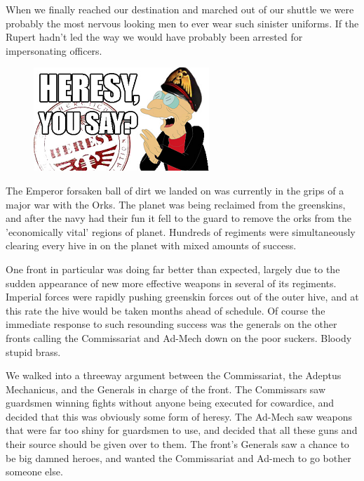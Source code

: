 When we finally reached our destination and marched out of our shuttle we were probably the most nervous looking men to ever wear such sinister uniforms. 
If the Rupert hadn't led the way we would have probably been arrested for impersonating officers.

\begin{figure}
	\begin{center}
		\includegraphics[width=\figwidth]{pics/4/7.png}
	\end{center}
\end{figure}
The Emperor forsaken ball of dirt we landed on was currently in the grips of a major war with the Orks. 
The planet was being reclaimed from the greenskins, and after the navy had their fun it fell to the guard to remove the orks from the 'economically vital' regions of planet. 
Hundreds of regiments were simultaneously clearing every hive in on the planet with mixed amounts of success. 

One front in particular was doing far better than expected, largely due to the sudden appearance of new more effective weapons in several of its regiments.
Imperial forces were rapidly pushing greenskin forces out of the outer hive, and at this rate the hive would be taken months ahead of schedule. 
Of course the immediate response to such resounding success was the generals on the other fronts calling the Commissariat and Ad-Mech down on the poor suckers. 
Bloody stupid brass.

We walked into a threeway argument between the Commissariat, the Adeptus Mechanicus, and the Generals in charge of the front. 
The Commissars saw guardsmen winning fights without anyone being executed for cowardice, and decided that this was obviously some form of heresy. 
The Ad-Mech saw weapons that were far too shiny for guardsmen to use, and decided that all these guns and their source should be given over to them. 
The front's Generals saw a chance to be big damned heroes, and wanted the Commissariat and Ad-mech to go bother someone else.

